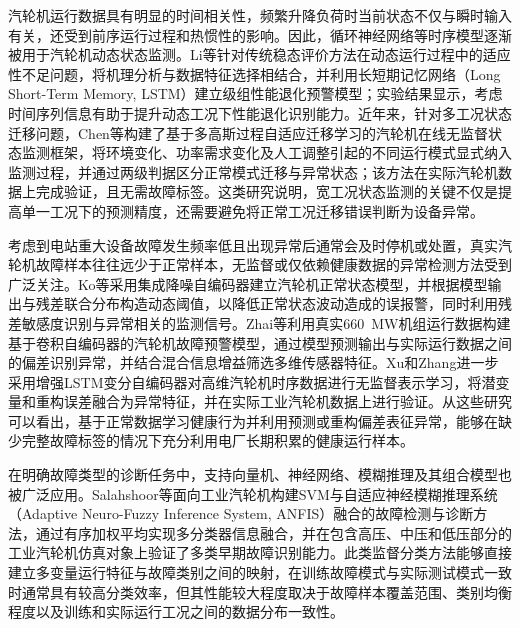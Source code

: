 汽轮机运行数据具有明显的时间相关性，频繁升降负荷时当前状态不仅与瞬时输入有关，还受到前序运行过程和热惯性的影响。因此，循环神经网络等时序模型逐渐被用于汽轮机动态状态监测。Li等针对传统稳态评价方法在动态运行过程中的适应性不足问题，将机理分析与数据特征选择相结合，并利用长短期记忆网络（Long Short-Term Memory, LSTM）建立级组性能退化预警模型；实验结果显示，考虑时间序列信息有助于提升动态工况下性能退化识别能力\cite{Li2021LSTMStageWarning}。近年来，针对多工况状态迁移问题，Chen等构建了基于多高斯过程自适应迁移学习的汽轮机在线无监督状态监测框架，将环境变化、功率需求变化及人工调整引起的不同运行模式显式纳入监测过程，并通过两级判据区分正常模式迁移与异常状态；该方法在实际汽轮机数据上完成验证，且无需故障标签\cite{Chen2023AdaptiveTransfer}。这类研究说明，宽工况状态监测的关键不仅是提高单一工况下的预测精度，还需要避免将正常工况迁移错误判断为设备异常。

考虑到电站重大设备故障发生频率低且出现异常后通常会及时停机或处置，真实汽轮机故障样本往往远少于正常样本，无监督或仅依赖健康数据的异常检测方法受到广泛关注。Ko等采用集成降噪自编码器建立汽轮机正常状态模型，并根据模型输出与残差联合分布构造动态阈值，以降低正常状态波动造成的误报警，同时利用残差敏感度识别与异常相关的监测信号\cite{Ko2022DynamicThresholdAE}。Zhai等利用真实660~MW机组运行数据构建基于卷积自编码器的汽轮机故障预警模型，通过模型预测输出与实际运行数据之间的偏差识别异常，并结合混合信息增益筛选多维传感器特征\cite{Zhai2024CAEWarning}。Xu和Zhang进一步采用增强LSTM变分自编码器对高维汽轮机时序数据进行无监督表示学习，将潜变量和重构误差融合为异常特征，并在实际工业汽轮机数据上进行验证\cite{Xu2025LSTMVAE}。从这些研究可以看出，基于正常数据学习健康行为并利用预测或重构偏差表征异常，能够在缺少完整故障标签的情况下充分利用电厂长期积累的健康运行样本。

在明确故障类型的诊断任务中，支持向量机、神经网络、模糊推理及其组合模型也被广泛应用。Salahshoor等面向工业汽轮机构建SVM与自适应神经模糊推理系统（Adaptive Neuro-Fuzzy Inference System, ANFIS）融合的故障检测与诊断方法，通过有序加权平均实现多分类器信息融合，并在包含高压、中压和低压部分的工业汽轮机仿真对象上验证了多类早期故障识别能力\cite{Salahshoor2010SVMANFIS}。此类监督分类方法能够直接建立多变量运行特征与故障类别之间的映射，在训练故障模式与实际测试模式一致时通常具有较高分类效率，但其性能较大程度取决于故障样本覆盖范围、类别均衡程度以及训练和实际运行工况之间的数据分布一致性。

